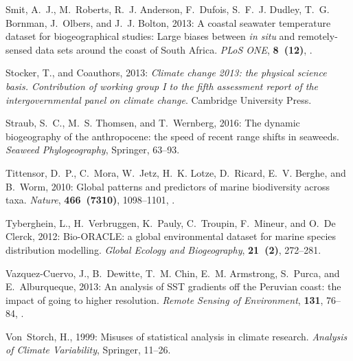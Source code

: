 \documentclass[twocol]{ametsoc}
\begin{document}
\begin{thebibliography}{41}
Smit, A.~J., M.~Roberts, R.~J. Anderson, F.~Dufois, S.~F.~J. Dudley, T.~G.
  Bornman, J.~Olbers, and J.~J. Bolton, 2013: {A coastal seawater temperature
  dataset for biogeographical studies: Large biases between \textit{in situ} and
  remotely-sensed data sets around the coast of South Africa}. \textit{PLoS
  ONE}, \textbf{8~(12)}, .

Stocker, T., and Coauthors, 2013: \textit{Climate change 2013: the
  physical science basis. Contribution of working group I to the fifth
  assessment report of the intergovernmental panel on climate change}.
  Cambridge University Press.

Straub, S.~C., M.~S. Thomsen, and T.~Wernberg, 2016: The dynamic biogeography
  of the anthropocene: the speed of recent range shifts in seaweeds.
  \textit{Seaweed Phylogeography}, Springer, 63--93.

Tittensor, D.~P., C.~Mora, W.~Jetz, H.~K. Lotze, D.~Ricard, E.~V. Berghe, and
  B.~Worm, 2010: {Global patterns and predictors of marine biodiversity across
  taxa.} \textit{Nature}, \textbf{466~(7310)}, 1098--1101,
  .

Tyberghein, L., H.~Verbruggen, K.~Pauly, C.~Troupin, F.~Mineur, and O.~{De
  Clerck}, 2012: {Bio-ORACLE: a global environmental dataset for marine species
  distribution modelling}. \textit{Global Ecology and Biogeography},
  \textbf{21~(2)}, 272--281.

Vazquez-Cuervo, J., B.~Dewitte, T.~M. Chin, E.~M. Armstrong, S.~Purca, and
  E.~Alburqueque, 2013: {An analysis of SST gradients off the Peruvian coast:
  the impact of going to higher resolution}. \textit{Remote Sensing of
  Environment}, \textbf{131}, 76--84, .

Von~Storch, H., 1999: Misuses of statistical analysis in climate research.
  \textit{Analysis of Climate Variability}, Springer, 11--26.


\end{thebibliography}
\end{document}
